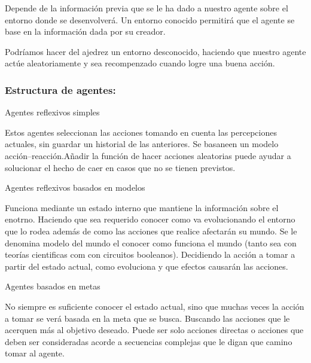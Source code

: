 \documentclass{article}
\begin{document}
Depende de la información previa que se le ha dado a nuestro agente sobre el entorno donde se desenvolverá. Un entorno conocido permitirá que el agente se base en la información dada por su creador.

Podríamos hacer del ajedrez un entorno desconocido, haciendo que nuestro agente actúe aleatoriamente y sea recompenzado cuando logre una buena acción.


\subsubsection{Estructura de agentes:}

\vspace{5mm}

Agentes reflexivos simples 

\vspace{5mm}

Estos agentes seleccionan las acciones tomando en cuenta las percepciones actuales, sin guardar un historial de las anteriores. Se basaneen un modelo acción--reacción.Añadir la función de hacer acciones aleatorias puede ayudar a solucionar el hecho de caer en casos que no se tienen previstos.

\vspace{5mm}

Agentes reflexivos basados en modelos

\vspace{5mm}


Funciona mediante un estado interno que mantiene la información sobre el enotrno. Haciendo que sea requerido conocer como va evolucionando  el entorno que lo rodea además de como las acciones que realice afectarán su mundo. Se le denomina modelo del mundo el conocer como funciona el mundo (tanto sea con teorías cientificas com con circuitos booleanos). Decidiendo la acción a tomar a partir del estado actual, como evoluciona y que efectos causarán las acciones.

\vspace{5mm}

Agentes basados en metas

\vspace{5mm}

No siempre es suficiente conocer el estado actual, sino que muchas veces la acción a tomar se verá basada en la meta que se busca. Buscando las acciones que le acerquen más al objetivo deseado. Puede ser solo acciones directas o acciones que deben ser consideradas acorde a secuencias complejas que le digan que camino tomar al agente.
\end{document}
